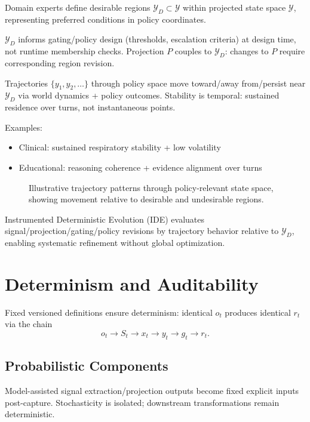 \documentclass[11pt]{article}
\begin{document}
Domain experts define desirable regions $\mathcal{Y}_D \subset \mathcal{Y}$ within projected state space $\mathcal{Y}$, representing preferred conditions in policy coordinates.

$\mathcal{Y}_D$ informs gating/policy design (thresholds, escalation criteria) at design time, not runtime membership checks. Projection $P$ couples to $\mathcal{Y}_D$: changes to $P$ require corresponding region revision.

Trajectories $\{y_1, y_2, \dots\}$ through policy space move toward/away from/persist near $\mathcal{Y}_D$ via world dynamics + policy outcomes. Stability is temporal: sustained residence over turns, not instantaneous points.

Examples:
\begin{itemize}
\item Clinical: sustained respiratory stability + low volatility
\item Educational: reasoning coherence + evidence alignment over turns
\end{itemize}

\begin{figure}[t]
\centering

\caption{Illustrative trajectory patterns through policy-relevant state space, showing movement relative to desirable and undesirable regions.}
\label{fig:esm-trajectories}
\end{figure}

Instrumented Deterministic Evolution (IDE) evaluates signal/projection/gating/policy revisions by trajectory behavior relative to $\mathcal{Y}_D$, enabling systematic refinement without global optimization.



\section{Determinism and Auditability}
\label{sec:determinism}

Fixed versioned definitions ensure determinism: identical $o_t$ produces identical $r_t$ via the chain
\[
o_t \rightarrow S_t \rightarrow x_t \rightarrow y_t \rightarrow g_t \rightarrow r_t.
\]

\subsection{Probabilistic Components}
Model-assisted signal extraction/projection outputs become fixed explicit inputs post-capture. Stochasticity is isolated; downstream transformations remain deterministic.
\end{document}
